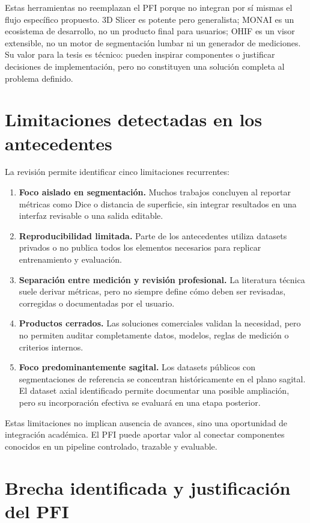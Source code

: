Estas herramientas no reemplazan el PFI porque no integran por sí mismas el flujo específico propuesto. 3D Slicer es potente pero generalista; MONAI es un ecosistema de desarrollo, no un producto final para usuarios; OHIF es un visor extensible, no un motor de segmentación lumbar ni un generador de mediciones. Su valor para la tesis es técnico: pueden inspirar componentes o justificar decisiones de implementación, pero no constituyen una solución completa al problema definido.


\section{Limitaciones detectadas en los antecedentes}

La revisión permite identificar cinco limitaciones recurrentes:

\begin{enumerate}
    \item \textbf{Foco aislado en segmentación.} Muchos trabajos concluyen al reportar métricas como Dice o distancia de superficie, sin integrar resultados en una interfaz revisable o una salida editable.
    \item \textbf{Reproducibilidad limitada.} Parte de los antecedentes utiliza datasets privados o no publica todos los elementos necesarios para replicar entrenamiento y evaluación.
    \item \textbf{Separación entre medición y revisión profesional.} La literatura técnica suele derivar métricas, pero no siempre define cómo deben ser revisadas, corregidas o documentadas por el usuario.
    \item \textbf{Productos cerrados.} Las soluciones comerciales validan la necesidad, pero no permiten auditar completamente datos, modelos, reglas de medición o criterios internos.
    \item \textbf{Foco predominantemente sagital.} Los datasets públicos con segmentaciones de referencia se concentran históricamente en el plano sagital. El dataset axial identificado permite documentar una posible ampliación, pero su incorporación efectiva se evaluará en una etapa posterior.
\end{enumerate}

Estas limitaciones no implican ausencia de avances, sino una oportunidad de integración académica. El PFI puede aportar valor al conectar componentes conocidos en un pipeline controlado, trazable y evaluable.

\section{Brecha identificada y justificación del PFI}

